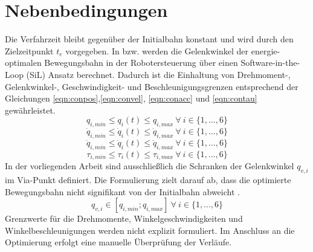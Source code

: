 \section{Nebenbedingungen}
\label{sec:Nebenbedingungen}
Die Verfahrzeit bleibt gegenüber der Initialbahn konstant und wird durch den Zielzeitpunkt $t_e$ vorgegeben. 
In \cite[S.~40]{Eggers.2019} bzw. \cite[S.~5]{Hansen.2012} werden die Gelenkwinkel der energie-optimalen Bewegungsbahn in der Robotersteuerung über einen Software-in-the-Loop (SiL) Ansatz berechnet. Dadurch ist die Einhaltung von Drehmoment-, Gelenkwinkel-, Geschwindigkeit- und Beschleunigungsgrenzen entsprechend der Gleichungen \ref{eqn:conpos},\ref{eqn:convel}, \ref{eqn:conacc} und \ref{eqn:contau} gewährleistet. 
%
\begin{equation}
	\label{eqn:conpos}
	q_{i,min} \leq q_{i}(t) \leq q_{i,max}  ~\forall~ i \in \{1,...,6\}
\end{equation}
%
\begin{equation}
	\label{eqn:convel}
	\dot{q}_{i,min} \leq \dot{q}_{i}(t) \leq \dot{q}_{i,max}  ~\forall~ i \in \{1,...,6\}
\end{equation}
%
\begin{equation}
	\label{eqn:conacc}
	\ddot{q}_{i,min} \leq \ddot{q}_{i}(t) \leq \ddot{q}_{i,max}  ~\forall~ i \in \{1,...,6\}
\end{equation}
%
\begin{equation}
	\label{eqn:contau}
	\tau_{i,min} \leq \tau_{i}(t) \leq \tau_{i,max}  ~\forall~ i \in \{1,...,6\}
\end{equation}
%
In der vorliegenden Arbeit sind ausschließlich die Schranken der Gelenkwinkel $q_{v,i}$ im Via-Punkt definiert. Die Formulierung zielt darauf ab, dass die optimierte Bewegungsbahn nicht signifikant von der Initialbahn abweicht \cite[S.~5]{Hansen.2012}.
\begin{equation}
	\label{eqn:Schranken}
	q_{v,i} \in [q_{i,min};q_{i,max}] ~\forall~ i \in \{1,...,6\}
\end{equation}
Grenzwerte für die Drehmomente, Winkelgeschwindigkeiten und Winkelbeschleunigungen werden nicht explizit formuliert.  Im Anschluss an die Optimierung erfolgt eine manuelle Überprüfung der Verläufe.
%
